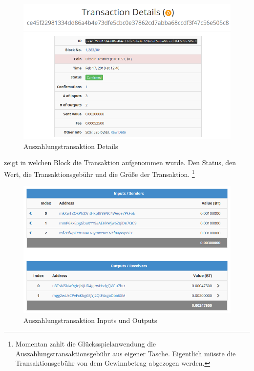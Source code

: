 \begin{figure}[H]
\centering
\includegraphics[width=1\linewidth]{Figures/btc_gui/btc_txn}
\decoRule
\caption{Auszahlungstransaktion Details}
\label{fig:btc_txn}
\end{figure}

\label{fig:btc_txn} zeigt in welchen Block die Transaktion aufgenommen wurde. Den Status, den Wert, die Transaktionsgebühr und die Größe der Transaktion.
\footnote{Momentan zahlt die Glücksspielanwendung die Auszahlungstransaktionsgebühr aus eigener Tasche. Eigentlich müsste die Transaktionsgebühr von dem Gewinnbetrag abgezogen werden.}

\begin{figure}[H]
\centering
\includegraphics[width=1\linewidth]{Figures/btc_gui/btc_txn_input_output}
\decoRule
\caption{Auszahlungstransaktion Inputs und Outputs}
\label{fig:btc_txn_input_output}
\end{figure}


